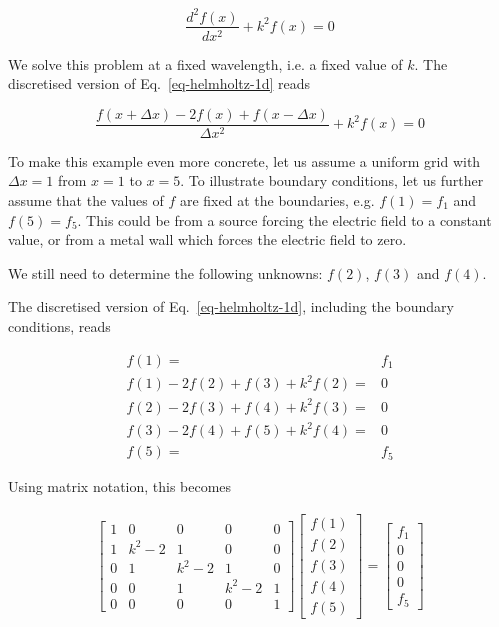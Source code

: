 \begin{equation}
\frac{d^2 f(x)}{d x^2} + k^2 f(x) = 0 \label{eq-helmholtz-1d}
\end{equation} 

We solve this problem at a fixed wavelength, i.e. a fixed value of $k$. The discretised version of Eq.~\ref{eq-helmholtz-1d} reads

\begin{equation}
\frac{f(x + \Delta x) -2 f(x) + f(x- \Delta x)}{ \Delta x^2} + k^2 f(x) = 0 \label{eq-hh-diff}
\end{equation}  
 
To make this example even more concrete, let us assume a uniform grid with $\Delta x=1$ from $x=1$ to $x=5$. To illustrate boundary conditions, let us further assume that the values of $f$ are fixed at the boundaries, e.g. $f(1)=f_1$ and $f(5)=f_5$. This could be from a source forcing the electric field to a constant value, or from a metal wall which forces the electric field to zero. 

We still need to determine the following unknowns: $f(2)$, $f(3)$ and $f(4)$.

The discretised version of Eq.~\ref{eq-helmholtz-1d}, including the boundary conditions, reads

\begin{align}
f(1)=&f_1 \\
f(1) -2f(2) + f(3) + k^2 f(2) =& 0 \\
f(2) -2f(3) + f(4) + k^2 f(3) =& 0\\
f(3) -2f(4) + f(5) + k^2 f(4) =& 0\\
f(5)=&f_5
\end{align} 

Using matrix notation, this becomes

\begin{gather}
\begin{bmatrix}
1& 0& 0& 0& 0 \\
1& k^2-2& 1& 0& 0 \\
0& 1& k^2-2& 1& 0  \\
0& 0& 1& k^2-2& 1  \\
0& 0& 0& 0& 1
\end{bmatrix}
\begin{bmatrix}
f(1) \\
f(2) \\
f(3) \\
f(4) \\
f(5)
\end{bmatrix}
= 
\begin{bmatrix}
f_1 \\
0 \\
0 \\
0 \\
f_5
\end{bmatrix} \label{eq-ex-fd}
\end{gather}

